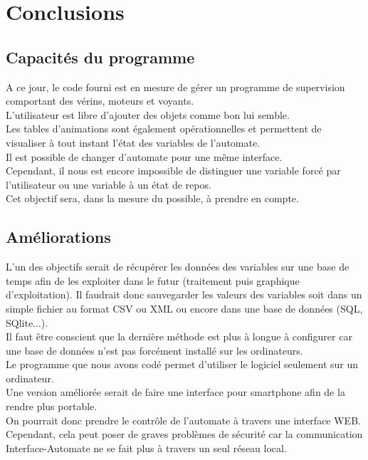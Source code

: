 
\chapter{Conclusions}

\section{Capacités du programme}

A ce jour, le code fourni est en mesure de gérer un programme de supervision comportant des vérins, moteurs et voyants. \\
L'utilisateur est libre d'ajouter des objets comme bon lui semble. \\

Les tables d'animations sont également opérationnelles et permettent de visualiser à tout instant l'état des variables de l'automate. \\
Il est possible de changer d'automate pour une même interface. \\
Cependant, il nous est encore impossible de distinguer une variable forcé par l'utilisateur ou une variable à un état de repos. \\
Cet objectif sera, dans la mesure du possible, à prendre en compte. \\


\section{Améliorations}

L'un des objectifs serait de récupérer les données des variables sur une base de temps afin de les exploiter dans le futur (traitement puis graphique d'exploitation). Il faudrait donc sauvegarder les valeurs des variables soit dans un simple fichier au format CSV ou XML ou encore dans une base de données (SQL, SQlite...). \\
Il faut être conscient que la dernière méthode est plus à longue à configurer car une base de données n'est pas forcément installé sur les ordinateurs. \\

Le programme que nous avons codé permet d'utiliser le logiciel seulement sur un ordinateur. \\
Une version améliorée serait de faire une interface pour smartphone afin de la rendre plus portable. \\
On pourrait donc prendre le contrôle de l'automate à travers une interface WEB. Cependant, cela peut poser de graves problèmes de sécurité car la communication Interface-Automate ne se fait plus à travers un seul réseau local.


